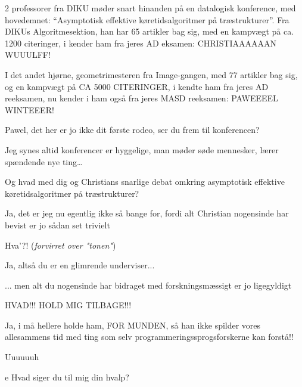 \documentclass[a4paper,11pt]{article}
\begin{document}
\begin{sketch}
 2 professorer fra DIKU møder snart hinanden på en datalogisk konference, med hovedemnet: “Asymptotisk effektive køretidsalgoritmer på træstrukturer”. Fra DIKUs Algoritmesektion, han har 65 artikler bag sig, med en kampvægt på ca. 1200 citeringer, i kender ham fra jeres AD eksamen: CHRISTIAAAAAAN WUUULFF!


 I det andet hjørne, geometrimesteren fra Image-gangen, med 77 artikler bag sig, og en kampvægt på CA 5000 CITERINGER, i kendte ham fra jeres AD reeksamen, nu kender i ham også fra jeres MASD reeksamen: PAWEEEEL WINTEEER! 



 Pawel, det her er jo ikke dit første rodeo, ser du frem til konferencen?

 Jeg synes altid konferencer er hyggelige, man møder søde mennesker, lærer spændende nye ting…

 Og hvad med dig og Christians snarlige debat omkring asymptotisk effektive køretidsalgoritmer på træstrukturer?

 Ja, det er jeg nu egentlig ikke så bange for, fordi alt Christian nogensinde har bevist er jo sådan set trivielt

 Hva'?! (\textit{forvirret over "tonen"})

 Ja, altså du er en glimrende underviser... 


... men alt du nogensinde har bidraget med forskningsmæssigt er jo ligegyldigt

 HVAD!!! HOLD MIG TILBAGE!!!


 Ja, i må hellere holde ham, FOR MUNDEN, så han ikke spilder vores allesammens tid med ting som selv programmeringssprogsforskerne kan forstå!!

 Uuuuuuh

e
 Hvad siger du til mig din hvalp?


\end{sketch}
\end{document}
